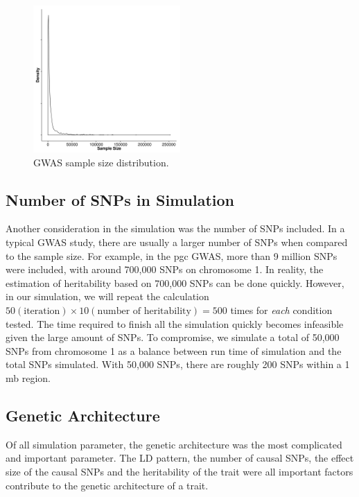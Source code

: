 			\begin{figure}
				\centering
				\includegraphics[width=0.5\textwidth]{figure/gwasSampleSize.png}
				\caption[GWAS Sample Size distribution]{
					\gls{GWAS} sample size distribution.
				}
				\label{fig:gwasCata}
			\end{figure}
		\subsection{Number of SNPs in Simulation}
			Another consideration in the simulation was the number of \glspl{SNP} included.
			In a typical \gls{GWAS} study, there are usually a larger number of \glspl{SNP} when compared to the sample size. 
			For example, in the \gls{pgc}  \gls{GWAS}, more than 9 million \glspl{SNP} were included, with around 700,000 \glspl{SNP} on chromosome 1.
			In reality, the estimation of heritability based on 700,000 \glspl{SNP} can be done quickly.
			However, in our simulation, we will repeat the calculation $50(\text{iteration})\times10(\text{number of heritability})=500$ times for \emph{each} condition tested. 
			The time required to finish all the simulation quickly becomes infeasible given the large amount of \glspl{SNP}.
			To compromise, we simulate a total of 50,000 \glspl{SNP} from chromosome 1 as a balance between run time of simulation and the total \glspl{SNP} simulated.
			With 50,000 \glspl{SNP}, there are roughly 200 \glspl{SNP} within a 1 \gls{mb} region.
		\subsection{Genetic Architecture}
			Of all simulation parameter, the genetic architecture was the most complicated and important parameter. 
			The \gls{LD} pattern, the number of causal \glspl{SNP}, the effect size of the causal \glspl{SNP} and the heritability of the trait were all important factors contribute to the genetic architecture of a trait. 
		

